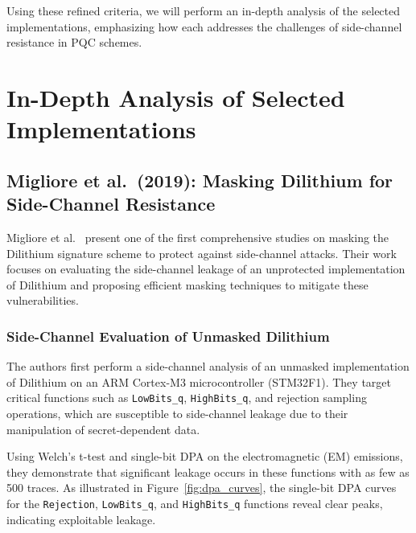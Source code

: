 Using these refined criteria, we will perform an in-depth analysis of the selected implementations, emphasizing how each addresses the challenges of side-channel resistance in \ac{PQC} schemes.

\section{In-Depth Analysis of Selected Implementations}

\subsection{Migliore et al.\ (2019): Masking Dilithium for Side-Channel Resistance}

Migliore et al.\ \cite{Migliore19} present one of the first comprehensive studies on masking the Dilithium signature scheme to protect against side-channel attacks. Their work focuses on evaluating the side-channel leakage of an unprotected implementation of Dilithium and proposing efficient masking techniques to mitigate these vulnerabilities.

\subsubsection{Side-Channel Evaluation of Unmasked Dilithium}

The authors first perform a side-channel analysis of an unmasked implementation of Dilithium on an ARM Cortex-M3 microcontroller (STM32F1). They target critical functions such as \texttt{LowBits\_q}, \texttt{HighBits\_q}, and rejection sampling operations, which are susceptible to side-channel leakage due to their manipulation of secret-dependent data.

Using Welch's t-test and single-bit DPA on the electromagnetic (EM) emissions, they demonstrate that significant leakage occurs in these functions with as few as 500 traces. As illustrated in Figure~\ref{fig:dpa_curves}, the single-bit DPA curves for the \texttt{Rejection}, \texttt{LowBits\_q}, and \texttt{HighBits\_q} functions reveal clear peaks, indicating exploitable leakage.

